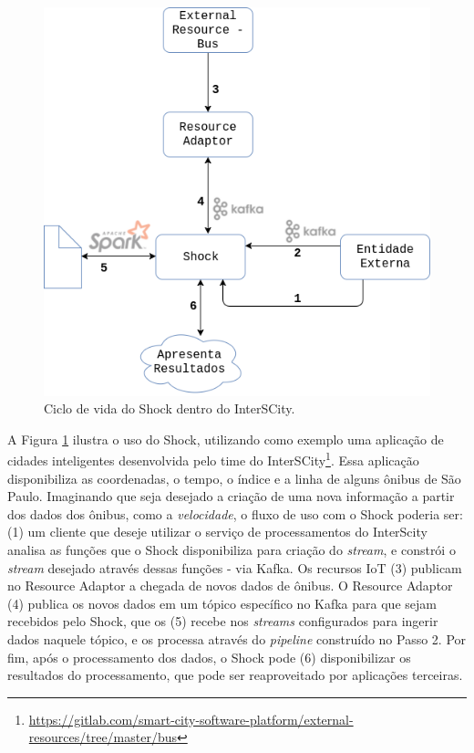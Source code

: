 \begin{figure}
  \centering
    \includegraphics[scale=0.45]{figuras/shock.png}
    \caption{Ciclo de vida do Shock dentro do InterSCity.}
  \label{fig:shock}
\end{figure}

A Figura \ref{fig:shock} ilustra o uso do Shock, utilizando como exemplo uma
aplicação de cidades inteligentes desenvolvida pelo time do
InterSCity\footnote{\url{https://gitlab.com/smart-city-software-platform/external-resources/tree/master/bus}}.
Essa aplicação disponibiliza as coordenadas, o tempo, o índice e a linha de
alguns ônibus de São Paulo. Imaginando que seja desejado a criação de uma nova
informação a partir dos dados dos ônibus, como a \textit{velocidade}, o fluxo
de uso com o Shock poderia ser: (1) um cliente que deseje utilizar o serviço
de processamentos do InterScity analisa as funções que o Shock disponibiliza
para criação do \textit{stream}, e constrói o \textit{stream} desejado através
dessas funções - via Kafka. Os recursos IoT (3) publicam no Resource Adaptor a
chegada de novos dados de ônibus. O Resource Adaptor (4) publica os novos dados
em um tópico específico no Kafka para que sejam recebidos pelo Shock, que os (5)
recebe nos \textit{streams} configurados para ingerir dados naquele tópico, e
os processa através do \textit{pipeline} construído no Passo 2. Por fim, após o
processamento dos dados, o Shock pode (6) disponibilizar os resultados do
processamento, que pode ser reaproveitado por aplicações terceiras.
